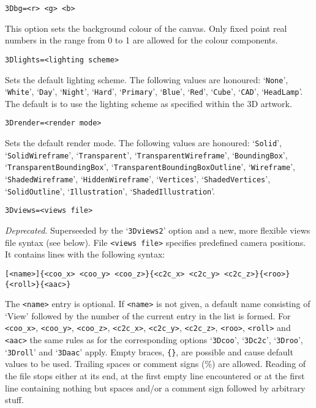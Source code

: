 \documentclass[a4paper]{article}
\begin{document}
\begin{verbatim}
3Dbg=<r> <g> <b>
\end{verbatim}
This option sets the background colour of the canvas. Only fixed point real numbers in the range from 0 to 1 are allowed for the colour components.
\begin{verbatim}
3Dlights=<lighting scheme>
\end{verbatim}
Sets the default lighting scheme. The following values are honoured: `\verb+None+', `\verb+White+', `\verb+Day+', `\verb+Night+', `\verb+Hard+', `\verb+Primary+', `\verb+Blue+', `\verb+Red+', `\verb+Cube+', `\verb+CAD+', `\verb+HeadLamp+'. The default is to use the lighting scheme as specified within the 3D artwork.
\begin{verbatim}
3Drender=<render mode>
\end{verbatim}
\begin{flushleft}
Sets the default render mode. The following values are honoured: `\verb+Solid+', `\verb+SolidWireframe+', `\verb+Transparent+', `\verb+TransparentWireframe+', `\verb+BoundingBox+', `\verb+TransparentBoundingBox+', `\verb+TransparentBoundingBoxOutline+', `\verb+Wireframe+', `\verb+ShadedWireframe+', `\verb+HiddenWireframe+', `\verb+Vertices+', `\verb+ShadedVertices+', `\verb+SolidOutline+', `\verb+Illustration+', `\verb+ShadedIllustration+'.
\end{flushleft}

\begin{verbatim}
3Dviews=<views file>
\end{verbatim}
\emph{Deprecated}. Superseeded by the `\verb+3Dviews2+' option and a new, more flexible views file syntax (see below). File \verb+<views file>+ specifies predefined camera positions. It contains lines with the following syntax:
\begin{verbatim}
[<name>]{<coo_x> <coo_y> <coo_z>}{<c2c_x> <c2c_y> <c2c_z>}{<roo>}{<roll>}{<aac>}
\end{verbatim}
The \verb+<name>+ entry is optional. If \verb+<name>+ is not given, a default name consisting of `View' followed by the number of the current entry in the list is formed. For \verb+<coo_x>+, \verb+<coo_y>+, \verb+<coo_z>+, \verb+<c2c_x>+, \verb+<c2c_y>+, \verb+<c2c_z>+, \verb+<roo>+, \verb+<roll>+ and \verb+<aac>+ the same rules as for the corresponding options `\verb+3Dcoo+', `\verb+3Dc2c+', `\verb+3Droo+', `\verb+3Droll+' and `\verb+3Daac+' apply. Empty braces, \verb+{}+, are possible and cause default values to be used. Trailing spaces or comment signs (\%) are allowed. Reading of the file stops either at its end, at the first empty line encountered or at the first line containing nothing but spaces and/or a comment sign followed by arbitrary stuff.%
\end{document}
